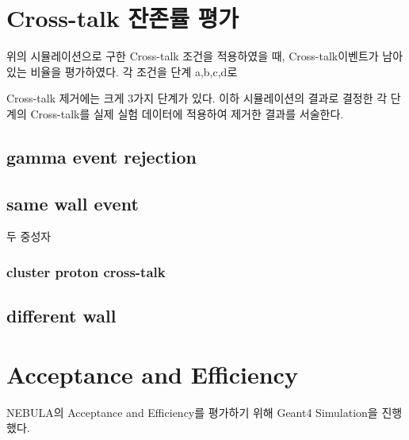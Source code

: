 \section{Cross-talk 잔존률 평가}
위의 시뮬레이션으로 구한 Cross-talk 조건을 적용하였을 때, Cross-talk이벤트가 남아있는 비율을 평가하였다. 각 조건을 단계 a,b,c,d로 

Cross-talk 제거에는 크게 3가지 단계가 있다. 
이하 시뮬레이션의 결과로 결정한 각 단계의 Cross-talk를 실제 실험 데이터에 적용하여 제거한 결과를 서술한다.
\subsection{gamma event rejection}

\subsection{same wall event}
두 중성자

\subsubsection{cluster proton cross-talk}


\subsection{different wall}

\section{Acceptance and Efficiency}

NEBULA의 Acceptance and Efficiency를 평가하기 위해 Geant4 Simulation을 진행했다. 